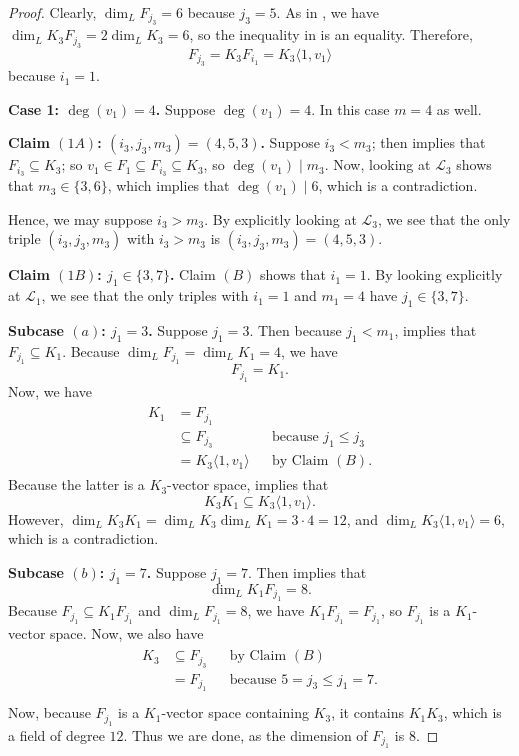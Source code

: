 \documentclass[letterpaper,10pt]{amsart}
\newcommand{\cL}{\mathcal{L}}
\theoremstyle{definition}
\theoremstyle{remark}
\begin{document}
\begin{proof}
Clearly, $\dim_{L}F_{j_3} = 6$ because $j_3 = 5$. As in , we have $\dim_{L}K_3F_{j_3} = 2 \dim_{L} K_3 = 6$, so the inequality in  is an equality. Therefore,
\begin{equation*}
    F_{j_3} = K_3F_{i_1} = K_3\langle 1,v_1\rangle
\end{equation*}
because $i_1 = 1$. 


\noindent \textbf{Case 1: $\deg(v_1) = 4$.}
Suppose $\deg(v_1) = 4$. In this case $m = 4$ as well. 

\noindent \textbf{Claim $(1A)$: $(i_3,j_3,m_3) = (4,5,3)$.}
Suppose $i_3 < m_3$; then  implies that $F_{i_3} \subseteq K_{3}$; so $v_1 \in F_1 \subseteq F_{i_3} \subseteq K_{3}$, so $\deg(v_1) \mid m_{3}$. Now, looking at $\cL_3$ shows that $m_3 \in \{3,6\}$, which implies that $\deg(v_1) \mid 6$, which is a contradiction. 

Hence, we may suppose $i_3 > m_3$. By explicitly looking at $\cL_3$, we see that the only triple $(i_3,j_3,m_3)$ with  $i_3 > m_3$ is $(i_3,j_3,m_3) = (4,5,3)$. 

\noindent \textbf{Claim $(1B)$: $j_1 \in \{3,7\}$.}
Claim $(B)$ shows that $i_1 = 1$. By looking explicitly at $\cL_1$, we see that the only triples with $i_1 = 1$ and $m_1 = 4$ have $j_1 \in \{3,7\}$.

\noindent \textbf{Subcase $(a)$: $j_1 = 3$.} Suppose $j_1 = 3$. Then because $j_1 < m_1$,  implies that $F_{j_1} \subseteq K_1$. Because $\dim_{L}F_{j_1} = \dim_{L}K_1 = 4$, we have
\[
    F_{j_1} = K_1.
\]
Now, we have
\begin{gather}
\label{eqn:who-knows}
\begin{aligned}
    K_1 &= F_{j_1} && \\
    &\subseteq F_{j_3} && \text{because $j_1 \leq j_3$}\\
    &=K_3\langle 1,v_1\rangle && \text{by Claim $(B)$}.
\end{aligned}
\end{gather}
Because the latter is a $K_3$-vector space,  implies that
\[
    K_3 K_1 \subseteq K_3\langle 1,v_1\rangle.
\]
However, $\dim_{L}K_3K_1 = \dim_{L}K_3 \dim_{L}K_1 = 3 \cdot 4 = 12$, and $\dim_{L}K_3\langle 1,v_1\rangle = 6$, which is a contradiction.

\noindent \textbf{Subcase $(b)$: $j_1 = 7$.} Suppose $j_1 = 7$. Then  implies that
\[
    \dim_{L} K_1 F_{j_1} = 8.
\]
Because $F_{j_1} \subseteq K_1 F_{j_1}$ and $\dim_{L} F_{j_1} = 8$, we have $ K_1 F_{j_1} = F_{j_1}$, so $F_{j_1}$ is a $K_1$-vector space. Now, we also have
\begin{gather}
\begin{aligned}
K_3 &\subseteq F_{j_3} && \text{by Claim $(B)$} \\
&= F_{j_1} && \text{because $5 = j_3 \leq j_1 = 7$}. \\
\end{aligned}
\end{gather}
Now, because $F_{j_1}$ is a $K_1$-vector space containing $K_3$, it contains $K_1K_3$, which is a field of degree $12$. Thus we are done, as the dimension of $F_{j_1}$ is $8$.


\end{proof}
\end{document}
